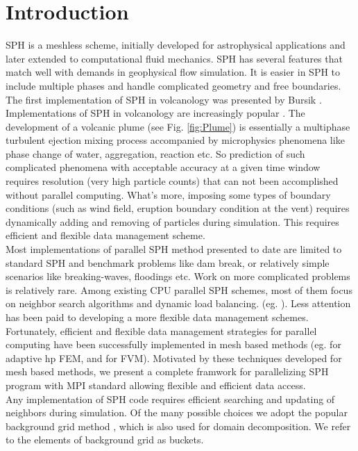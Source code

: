 \documentclass[procedia]{easychair}
\begin{document}
\section{Introduction}
\label{sect:introduction}
SPH is a meshless scheme, initially developed for astrophysical applications and later extended to computational fluid mechanics. SPH has several features that match well with demands in geophysical flow simulation. It is easier in SPH to include multiple phases and handle complicated geometry and free boundaries. The first implementation of SPH in volcanology was presented by Bursik \cite{bursik2003smoothed}. Implementations of SPH in volcanology are increasingly popular \cite{mcdougall2004model,
 prakash2011three, haddad2016smoothed} . The development  of a volcanic plume (see Fig. \ref{fig:Plume}) is essentially a multiphase turbulent ejection mixing process accompanied by microphysics phenomena like phase change of water, aggregation, reaction etc. So prediction of such complicated phenomena with acceptable accuracy at a given time window requires resolution (very high particle counts) that can not been accomplished without parallel computing. What's more, imposing  some types of boundary conditions (such as wind field, eruption boundary condition at the vent) requires dynamically adding and removing of particles during simulation. This requires efficient and flexible data management scheme.\\
Most implementations of parallel SPH method presented to date are limited to standard SPH and benchmark problems like dam break, or relatively
simple scenarios like breaking-waves, floodings etc. Work on more complicated problems is relatively rare. Among existing CPU parallel SPH schemes, most of them focus on neighbor search algorithms and dynamic load balancing. (eg. \cite{ferrari2009new, crespo2015dualsphysics}). Less attention has been paid to developing  a
more flexible data management schemes. 
Fortunately, efficient and flexible data management strategies for parallel computing have been successfully implemented in mesh based methods (eg. \cite{laszloffy2000simple} for adaptive hp FEM, and \cite{patra2005parallel} for FVM). Motivated by these techniques developed for mesh based methods, we present a complete framwork for parallelizing SPH program with MPI standard allowing flexible and efficient data access.\\
Any implementation of SPH code requires efficient searching and updating of neighbors during simulation. Of the many possible choices we adopt the popular background grid method \cite{monaghan1985refined}, which is also used for domain decomposition. We refer to the elements of background grid as buckets. 
\end{document}
